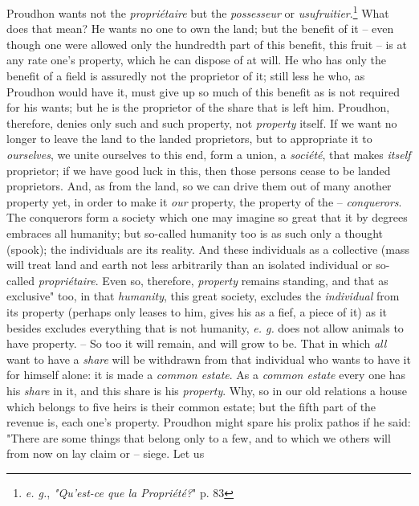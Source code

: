 \documentclass[a4paper]{book}
\begin{document}
Proudhon wants not the \textit{propri\'etaire} but the \textit{possesseur} or 
\textit{usufruitier}.\footnote{\textit{e. g.}, \textit{"{}Qu'est-ce que la 
Propri\'et\'e?}"{} p. 83} What does that mean? He wants no one to own the 
land; but the benefit of it -- even though one were allowed only the hundredth 
part of this benefit, this fruit -- is at any rate one's property, which he 
can dispose of at will. He who has only the benefit of a field is assuredly 
not the proprietor of it; still less he who, as Proudhon would have it, must 
give up so much of this benefit as is not required for his wants; but he is 
the proprietor of the share that is left him. Proudhon, therefore, denies only 
such and such property, not \textit{property} itself. If we want no longer to 
leave the land to the landed proprietors, but to appropriate it to 
\textit{ourselves}, we unite ourselves to this end, form a union, a 
\textit{soci\'et\'e}, that makes \textit{itself} proprietor; if we have good 
luck in this, then those persons cease to be landed proprietors. And, as from 
the land, so we can drive them out of many another property yet, in order to 
make it \textit{our} property, the property of the -- \textit{conquerors}. The 
conquerors form a society which one may imagine so great that it by degrees 
embraces all humanity; but so-called humanity too is as such only a thought 
(spook); the individuals are its reality. And these individuals as a 
collective (mass will treat land and earth not less arbitrarily than an 
isolated individual or so-called \textit{propri\'etaire}. Even so, therefore, 
\textit{property} remains standing, and that as exclusive"{} too, in that 
\textit{humanity}, this great society, excludes the \textit{individual} from 
its property (perhaps only leases to him, gives his as a fief, a piece of it) 
as it besides excludes everything that is not humanity, \textit{e. g.} does 
not allow animals to have property. -- So too it will remain, and will grow to 
be. That in which \textit{all} want to have a \textit{share} will be withdrawn 
from that individual who wants to have it for himself alone: it is made a 
\textit{common estate}. As a \textit{common estate} every one has his 
\textit{share} in it, and this share is his \textit{property}. Why, so in our 
old relations a house which belongs to five heirs is their common estate; but 
the fifth part of the revenue is, each one's property. Proudhon might spare 
his prolix pathos if he said: "{}There are some things that belong only to a 
few, and to which we others will from now on lay claim or -- siege. Let us 
\end{document}
